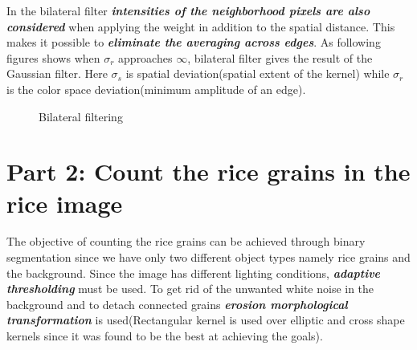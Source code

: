 \documentclass[a4paper,11pt]{article}%
\begin{document}
In the bilateral filter \textbf{\textit{intensities of the neighborhood pixels are also considered}} when applying the weight in addition to the spatial distance. This makes it possible to \textbf{\textit{eliminate the averaging across edges}}. As following figures shows when $\sigma_r$ approaches $\infty$, bilateral filter gives the result of the Gaussian filter. Here $\sigma_s$ is spatial deviation(spatial extent of the kernel) while $\sigma_r$ is the color space deviation(minimum amplitude of an edge).



\begin{figure}[!h]
	\centering
\caption{Bilateral filtering}
\end{figure}



\section{Part 2: Count the rice grains in the rice image}

The objective of counting the rice grains can be achieved through binary segmentation since we have only two different object types namely rice grains and the background. Since the image has different lighting conditions, \textbf{\textit{adaptive thresholding}} must be used. To get rid of the unwanted white noise in the background and to detach connected grains \textbf{\textit{erosion morphological transformation}} is used(Rectangular kernel is used over elliptic and cross shape kernels since it was found to be the best at achieving the goals).
\end{document}
